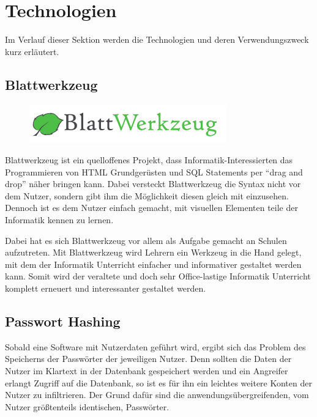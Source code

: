 \section{Technologien}
\label{sec:technology}
Im Verlauf dieser Sektion werden die Technologien und deren Verwendungszweck
kurz erläutert.

\subsection{Blattwerkzeug}
\label{sec:blattwerkzeug}

\begin{figure}
	\includegraphics[scale=0.4]{graphics/blattwerkzeug.png}
\end{figure}


Blattwerkzeug ist ein quelloffenes Projekt, dass Informatik-Interessierten das Programmieren von \gls{HTML} Grundgerüsten und SQL Statements per \enquote{drag and drop} näher bringen kann. Dabei versteckt Blattwerkzeug die Syntax nicht vor dem Nutzer, sondern gibt ihm die Möglichkeit diesen gleich mit einzusehen. Dennoch ist es dem Nutzer einfach gemacht, mit visuellen Elementen teile der Informatik kennen zu lernen.

Dabei hat es sich Blattwerkzeug vor allem als Aufgabe gemacht an Schulen aufzutreten. Mit Blattwerkzeug wird Lehrern ein Werkzeug in die Hand gelegt, mit dem der Informatik Unterricht einfacher und informativer gestaltet werden kann. Somit wird der veraltete und doch sehr Office-lastige Informatik Unterricht komplett erneuert und interessanter gestaltet werden.

\subsection{Passwort Hashing}
\label{sec:password_hashing}

Sobald eine Software mit Nutzerdaten geführt wird, ergibt sich das Problem des Speicherns der Passwörter der jeweiligen Nutzer.
Denn sollten die Daten der Nutzer im Klartext in der Datenbank gespeichert werden und ein Angreifer erlangt Zugriff auf die Datenbank, so ist es für ihn ein leichtes weitere Konten der Nutzer zu infiltrieren. Der Grund dafür sind die anwendungsübergreifenden, vom Nutzer grö{\ss}tenteils identischen, Passwörter.

